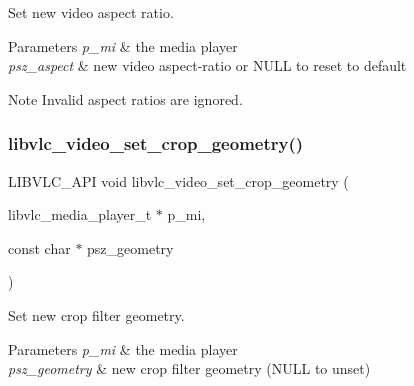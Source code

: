 Set new video aspect ratio.


\begin{DoxyParams}{Parameters}
{\em p\+\_\+mi} & the media player \\
\hline
{\em psz\+\_\+aspect} & new video aspect-\/ratio or N\+U\+LL to reset to default \\
\hline
\end{DoxyParams}
\begin{DoxyNote}{Note}
Invalid aspect ratios are ignored. 
\end{DoxyNote}
\mbox{\label{group__libvlc__video_ga3547297d885a8820a85cefc82f1c0b2e}} 
\subsubsection{\texorpdfstring{libvlc\+\_\+video\+\_\+set\+\_\+crop\+\_\+geometry()}{libvlc\_video\_set\_crop\_geometry()}}
{\footnotesize\ttfamily L\+I\+B\+V\+L\+C\+\_\+\+A\+PI void libvlc\+\_\+video\+\_\+set\+\_\+crop\+\_\+geometry (\begin{DoxyParamCaption}\item[{libvlc\+\_\+media\+\_\+player\+\_\+t $\ast$}]{p\+\_\+mi,  }\item[{const char $\ast$}]{psz\+\_\+geometry }\end{DoxyParamCaption})}

Set new crop filter geometry.


\begin{DoxyParams}{Parameters}
{\em p\+\_\+mi} & the media player \\
\hline
{\em psz\+\_\+geometry} & new crop filter geometry (N\+U\+LL to unset) \\
\hline
\end{DoxyParams}
\mbox{\label{group__libvlc__video_ga9c1d0af7a58651fdf8803934e35f8c17}} 
